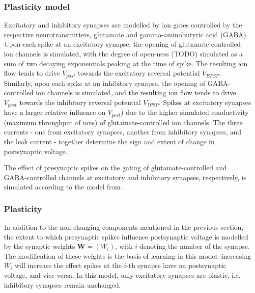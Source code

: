 \documentclass[a4paper,12pt]{report}
\theoremstyle{definition}
\begin{document}
\subsubsection{Plasticity model}

Excitatory and inhibitory synapses are modelled by ion gates controlled by the respective neurotransmitters, glutamate and gamma-aminobutyric acid (GABA). Upon each spike at an excitatory synapse, the opening of glutamate-controlled ion channels is simulated, with the degree of open-ness (TODO) simulated as a sum of two decaying exponentials peaking at the time of spike. The resulting ion flow tends to drive $V_{post}$ towards the excitatory reversal potential $V_{EPSP}$. Similarly, upon each spike at an inhibitory synapse, the opening of GABA-controlled ion channels is simulated, and the resulting ion flow tends to drive $V_{post}$ towards the inhibitory reversal potential $V_{IPSP}$. Spikes at excitatory synapses have a larger relative influence on $V_{post}$) due to the higher simulated conductivity (maximum throughput of ions) of glutamate-controlled ion channels. The three currents - one from excitatory synapses, another from inhibitory synapses, and the leak current - together determine the sign and extent of change in postsynaptic voltage.

The effect of presynaptic spikes on the gating of glutamate-controlled and GABA-controlled channels at excitatory and inhibitory synapses, respectively, is simulated according to the model from \cite{borgers2008gamma}.




















\subsubsection{Plasticity}

In addition to the non-changing components mentioned in the previous section, the extent to which presynaptic spikes influence postsynaptic voltage is modelled by the synaptic weights $\boldsymbol{W}=(W_i)$, with $i$ denoting the number of the synapse. The modification of these weights is the basis of learning in this model: increasing $W_i$ will increase the effect spikes at the $i$-th synapse have on postsynaptic voltage, and vice versa. In this model, only excitatory synapses are plastic, i.e. inhibitory synapses remain unchanged.
\end{document}
